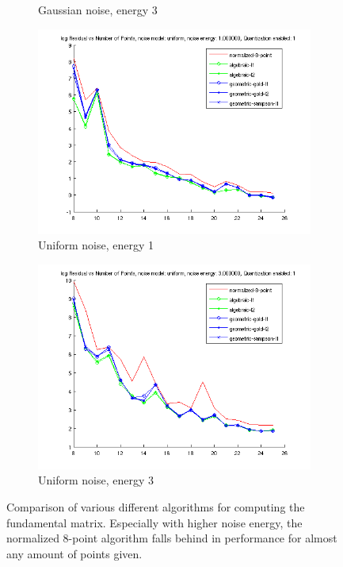 \documentclass{paper}
\begin{document}
\begin{figure}
\begin{subfigure}{0.4\textwidth}
   \caption{Gaussian noise, energy 3}
\end{subfigure}
\begin{subfigure}{0.4\textwidth}
   \includegraphics[width=\textwidth]{noise_uniform1}
   \caption{Uniform noise, energy 1}
\end{subfigure}
\begin{subfigure}{0.4\textwidth}
   \includegraphics[width=\textwidth]{noise_uniform3}
   \caption{Uniform noise, energy 3}
\end{subfigure}
\caption{Comparison of various different algorithms for computing the 
fundamental matrix. Especially with higher noise energy, the normalized 8-point
algorithm falls behind in performance for almost any amount of points given.}
\label{fig:comparison}
\end{figure}


\end{document}
